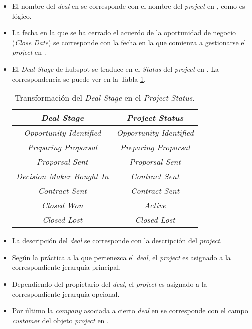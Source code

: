 \begin{itemize}

\item El nombre del \textit{deal} en \hs{} se corresponde con el nombre del \textit{project} en \wday{}, como es lógico.
\item La fecha en la que se ha cerrado el acuerdo de la oportunidad de negocio (\textit{Close Date}) se corresponde con la fecha en la que comienza a gestionarse el \textit{project} en \wday{}.
\item El \textit{Deal Stage} de hubspot se traduce en el \textit{Status} del \textit{project} en \wday{}. La correspondencia se puede ver en la Tabla \ref{tab:mapping_stage}.

\begin{table}[H]
\centering
\begin{tabular}{|c|c|}
  \hline
  \textbf{\textit{Deal Stage}} & \textbf{\textit{Project Status}} \\
  \hline
  \textit{Opportunity Identified} & \textit{Opportunity Identified} \\
  \textit{Preparing Proporsal} & \textit{Preparing Proporsal} \\
  \textit{Proporsal Sent} & \textit{Proporsal Sent} \\
  \textit{Decision Maker Bought In} & \textit{Contract Sent} \\
  \textit{Contract Sent} & \textit{Contract Sent} \\
  \textit{Closed Won} & \textit{Active} \\
  \textit{Closed Lost} & \textit{Closed Lost} \\
  \hline
\end{tabular}
	\caption{Transformación del \textit{Deal Stage} en el \textit{Project Status}.}
	\label{tab:mapping_stage}
\end{table}


\item La descripción del \textit{deal} se corresponde con la descripción del \textit{project}.
\item Según la práctica a la que pertenezca el \textit{deal}, el \textit{project} es asignado a la correspondiente jerarquía principal.
\item Dependiendo del propietario del \textit{deal}, el \textit{project} es asignado a la correspondiente jerarquía opcional.
\item Por último la \textit{company} asociada a cierto \textit{deal} en \hs{} se corresponde con el campo \textit{customer} del objeto \textit{project} en \wday{}.

\end{itemize}


